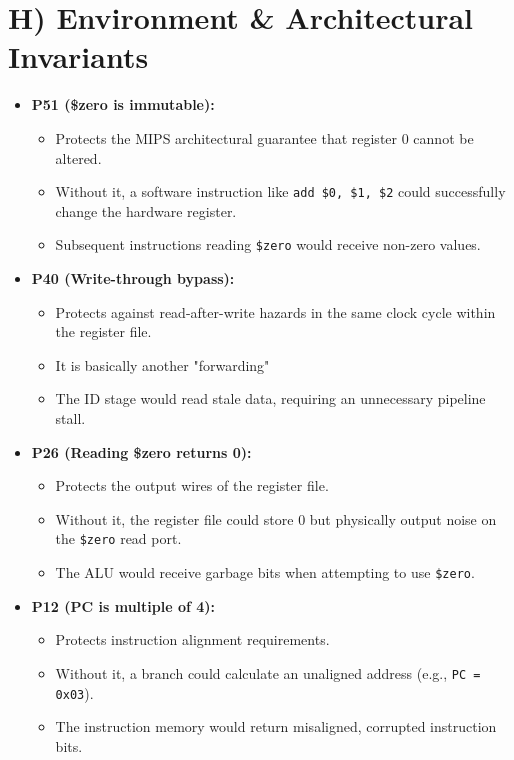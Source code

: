 \documentclass[11pt]{article}
\begin{document}
\section*{H) Environment \& Architectural Invariants}
\begin{itemize}
    \item \textbf{P51 (\$zero is immutable):} 
    \begin{itemize}
        \item Protects the MIPS architectural guarantee that register 0 cannot be altered.
        \item Without it, a software instruction like \texttt{add \$0, \$1, \$2} could successfully change the hardware register.
        \item Subsequent instructions reading \texttt{\$zero} would receive non-zero values.
    \end{itemize}

    \item \textbf{P40 (Write-through bypass):} 
    \begin{itemize}
        \item Protects against read-after-write hazards in the same clock cycle within the register file.
        \item It is basically another "forwarding"
        \item The ID stage would read stale data, requiring an unnecessary pipeline stall.
    \end{itemize}

    \item \textbf{P26 (Reading \$zero returns 0):} 
    \begin{itemize}
        \item Protects the output wires of the register file.
        \item Without it, the register file could store 0 but physically output noise on the \texttt{\$zero} read port.
        \item The ALU would receive garbage bits when attempting to use \texttt{\$zero}.
    \end{itemize}

    \item \textbf{P12 (PC is multiple of 4):} 
    \begin{itemize}
        \item Protects instruction alignment requirements.
        \item Without it, a branch could calculate an unaligned address (e.g., \texttt{PC = 0x03}).
        \item The instruction memory would return misaligned, corrupted instruction bits.
    \end{itemize}


\end{itemize}
\end{document}
